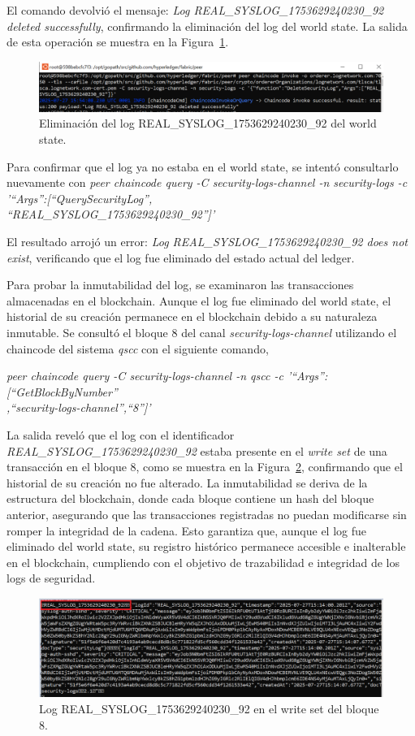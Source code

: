 El comando devolvió el mensaje: \textit{Log REAL\_SYSLOG\_1753629240230\_92 deleted successfully}, confirmando la eliminación del log del world state. La salida de esta operación se muestra en la Figura~\ref{fig:log-eliminado}.

\begin{figure}[H]
    \centering
    \includegraphics[width=1\textwidth]{figuras/log-eliminado.png}
    \caption{Eliminación del log REAL\_SYSLOG\_1753629240230\_92 del world state.}
    \label{fig:log-eliminado}
\end{figure}

Para confirmar que el log ya no estaba en el world state, se intentó consultarlo nuevamente con \textit{peer chaincode query -C security-logs-channel -n security-logs -c '{“Args”:[“QuerySecurityLog”,\\“REAL\_SYSLOG\_1753629240230\_92”]}'}


El resultado arrojó un error: \textit{Log REAL\_SYSLOG\_1753629240230\_92 does not exist}, verificando que el log fue eliminado del estado actual del ledger.

Para probar la inmutabilidad del log, se examinaron las transacciones almacenadas en el blockchain. Aunque el log fue eliminado del world state, el historial de su creación permanece en el blockchain debido a su naturaleza inmutable. Se consultó el bloque 8 del canal \textit{security-logs-channel} utilizando el chaincode del sistema \textit{qscc} con el siguiente comando, 

\textit{peer chaincode query -C security-logs-channel -n qscc -c '{“Args”:[“GetBlockByNumber”\\,“security-logs-channel”,“8”]}'}

La salida reveló que el log con el identificador \textit{REAL\_SYSLOG\_1753629240230\_92} estaba presente en el \textit{write set} de una transacción en el bloque 8, como se muestra en la Figura~\ref{fig:log-write-set}, confirmando que el historial de su creación no fue alterado. La inmutabilidad se deriva de la estructura del blockchain, donde cada bloque contiene un hash del bloque anterior, asegurando que las transacciones registradas no puedan modificarse sin romper la integridad de la cadena. Esto garantiza que, aunque el log fue eliminado del world state, su registro histórico permanece accesible e inalterable en el blockchain, cumpliendo con el objetivo de trazabilidad e integridad de los logs de seguridad.

\begin{figure}[H]
    \centering
    \includegraphics[width=1\textwidth]{figuras/log-write-set.png}
    \caption{Log REAL\_SYSLOG\_1753629240230\_92 en el write set del bloque 8.}
    \label{fig:log-write-set}
\end{figure}